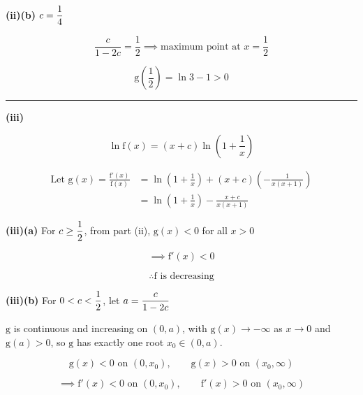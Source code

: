 \documentclass[12pt]{article}
\begin{document}
\textbf{(ii)(b)} $\displaystyle c=\frac14$

$$\frac{c}{1-2c}=\frac12\implies \text{maximum point at }x=\frac12$$

$$\mathrm{g}\left(\frac12\right)=\ln3-1>0$$

\begin{center}
\end{center}

\bigskip\hrule\bigskip

\textbf{(iii)}

$$\ln \mathrm{f}(x)=(x+c)\ln\left(1+\frac1x\right)$$

\begin{align*}
\text{Let }\mathrm{g}(x)=\frac{\mathrm{f}'(x)}{\mathrm{f}(x)}
&=\ln\left(1+\frac1x\right)+(x+c)\left(-\frac1{x(x+1)}\right)\\
&=\ln\left(1+\frac1x\right)-\frac{x+c}{x(x+1)}
\end{align*}


\textbf{(iii)(a)} For $\displaystyle c\geq\frac12$, from part (ii), $\mathrm{g}(x)<0$ for all $x>0$

$$\implies \mathrm{f}'(x)<0$$

$$\therefore \boxed{\mathrm{f}\text{ is decreasing}}$$

\textbf{(iii)(b)} For $\displaystyle 0<c<\frac12$, let $\displaystyle a=\frac{c}{1-2c}$

$\mathrm{g}$ is continuous and increasing on $(0,a)$, with $\mathrm{g}(x)\to-\infty$ as $x\to0$ and $\mathrm{g}(a)>0$, so $\mathrm{g}$ has exactly one root $x_0\in(0,a)$.

$$\mathrm{g}(x)<0\text{ on }(0,x_0),\qquad \mathrm{g}(x)>0\text{ on }(x_0,\infty)$$

$$\implies \mathrm{f}'(x)<0\text{ on }(0,x_0),\qquad \mathrm{f}'(x)>0\text{ on }(x_0,\infty)$$
\end{document}
